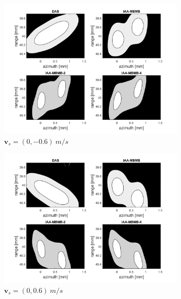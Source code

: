 \begin{figure}[ht]
\begin{subfigure}[t]{0.48\linewidth}
        \includegraphics[width=\linewidth]{./images/results/3/motion_90_-06.png}
        \caption{$\boldsymbol{v}_s = (0, -0.6)~m/s$}
    \end{subfigure}
    \quad
    \begin{subfigure}[t]{0.48\linewidth}
        \includegraphics[width=\linewidth]{./images/results/3/motion_90_06.png}
        \caption{$\boldsymbol{v}_s = (0, 0.6)~m/s$}
    \end{subfigure}
    \quad
    \begin{subfigure}[t]{0.48\linewidth}

\end{subfigure}
\end{figure}
